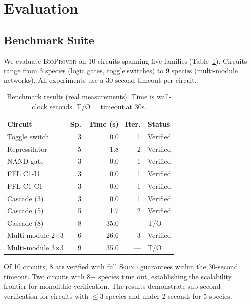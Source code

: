 \documentclass[11pt]{article}
\newcommand{\bioprover}{\textsc{BioProver}}
\begin{document}
\section{Evaluation}
\label{sec:evaluation}

\subsection{Benchmark Suite}

We evaluate \bioprover{} on 10 circuits spanning five families
(Table~\ref{tab:benchmarks}). Circuits range from 3 species (logic
gates, toggle switches) to 9 species (multi-module networks).
All experiments use a 30-second timeout per circuit.

\begin{table}[t]
\centering
\caption{Benchmark results (real measurements). Time is wall-clock seconds.
  T/O = timeout at 30s.}
\label{tab:benchmarks}
\small
\begin{tabular}{lrrrl}
\toprule
\textbf{Circuit} & \textbf{Sp.} & \textbf{Time (s)} &
  \textbf{Iter.} & \textbf{Status} \\
\midrule
Toggle switch        &  3 &  0.0 &  1 & Verified \\
Repressilator        &  5 &  1.8 &  2 & Verified \\
NAND gate            &  3 &  0.0 &  1 & Verified \\
FFL C1-I1            &  3 &  0.0 &  1 & Verified \\
FFL C1-C1            &  3 &  0.0 &  1 & Verified \\
Cascade (3)          &  3 &  0.0 &  1 & Verified \\
Cascade (5)          &  5 &  1.7 &  2 & Verified \\
Cascade (8)          &  8 & 35.0 & --- & T/O \\
Multi-module 2$\times$3 &  6 & 26.6 &  3 & Verified \\
Multi-module 3$\times$3 &  9 & 35.0 & --- & T/O \\
\bottomrule
\end{tabular}
\end{table}

Of 10 circuits, 8 are verified with full \textsc{Sound} guarantees
within the 30-second timeout. Two circuits with 8+ species time out,
establishing the scalability frontier for monolithic verification.
The results demonstrate sub-second verification for circuits with
$\leq 3$ species and under 2 seconds for 5 species.
\end{document}

